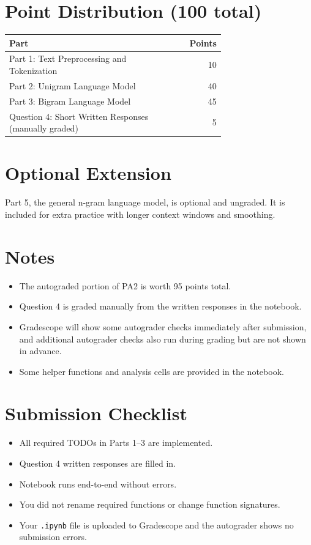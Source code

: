 \documentclass[11pt]{article}
\begin{document}
\section*{Point Distribution (100 total)}
\begin{center}
\begin{tabular}{|>{\raggedright\arraybackslash}p{0.7\linewidth}|r|}
\hline
\textbf{Part} & \textbf{Points} \\
\hline
Part 1: Text Preprocessing and Tokenization & 10 \\
\hline
Part 2: Unigram Language Model & 40 \\
\hline
Part 3: Bigram Language Model & 45 \\
\hline
Question 4: Short Written Responses (manually graded) & 5 \\
\hline
\end{tabular}
\end{center}

\section*{Optional Extension}
Part 5, the general n-gram language model, is optional and ungraded. It is
included for extra practice with longer context windows and smoothing.

\section*{Notes}
\begin{itemize}
  \item The autograded portion of PA2 is worth 95 points total.
  \item Question 4 is graded manually from the written responses in the notebook.
  \item Gradescope will show some autograder checks immediately after submission, and additional autograder checks also run during grading but are not shown in advance.
  \item Some helper functions and analysis cells are provided in the notebook.
\end{itemize}

\section*{Submission Checklist}
\begin{itemize}
  \item All required TODOs in Parts 1--3 are implemented.
  \item Question 4 written responses are filled in.
  \item Notebook runs end-to-end without errors.
  \item You did not rename required functions or change function signatures.
  \item Your \texttt{.ipynb} file is uploaded to Gradescope and the autograder shows no submission errors.
\end{itemize}
\end{document}
